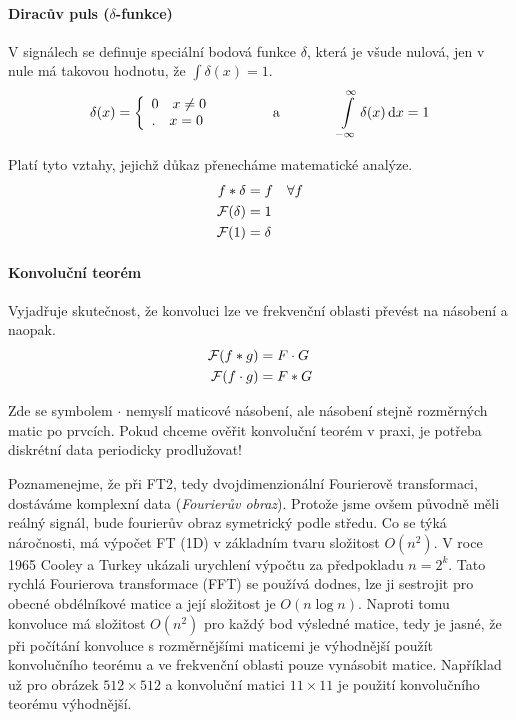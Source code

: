 \paragraph{Diracův puls ($\delta$-funkce)} 

V signálech se definuje speciální bodová funkce $\delta$, která je všude nulová, jen v nule má takovou hodnotu, že
$\int \delta(x)=1$.
\begin{align}
\delta(x) = \left\{\begin{array}{ll}0\quad x\neq0\\.\quad x=0\end{array}\right. \qquad \qquad \text{a} \qquad \qquad
\int\limits_{-\infty}^\infty\delta(x)\dif x = 1
\end{align}

Platí tyto vztahy, jejichž důkaz přenecháme matematické analýze.
\begin{align}
f\ast\delta &= f\quad\forall f\\
\operatorname{\mathcal{F}}(\delta) &= 1\\
\operatorname{\mathcal{F}}(1) &= \delta
\end{align}

\paragraph{Konvoluční teorém} Vyjadřuje skutečnost, že konvoluci lze ve frekvenční oblasti převést na násobení a naopak.
\begin{align}
\operatorname{\mathcal{F}}(f\ast g) &= F\cdot G\\
\operatorname{\mathcal{F}}(f\cdot g) &= F\ast G
\end{align}

Zde se symbolem $\cdot$ nemyslí maticové násobení, ale násobení stejně rozměrných matic po prvcích. Pokud chceme ověřit konvoluční teorém v praxi, je potřeba diskrétní data periodicky prodlužovat!

Poznamenejme, že při FT2, tedy dvojdimenzionální Fourierově transformaci, dostáváme komplexní data (\emph{Fourierův obraz}). Protože jsme ovšem původně měli reálný signál, bude fourierův obraz symetrický podle středu. Co se týká náročnosti, má výpočet FT (1D) v základním tvaru složitost $O(n^2)$. V roce 1965 Cooley a Turkey ukázali urychlení výpočtu za předpokladu $n=2^k$. Tato rychlá Fourierova transformace (FFT) se používá dodnes, lze ji sestrojit pro obecné obdélníkové matice a její složitost je $O(n\log n)$. Naproti tomu konvoluce má složitost $O(n^2)$ pro každý bod výsledné matice, tedy je jasné, že při počítání konvoluce s rozměrnějšími maticemi je výhodnější použít konvolučního teorému a ve frekvenční oblasti pouze vynásobit matice. Například už pro obrázek $512\times512$ a konvoluční matici $11\times11$ je použití konvolučního teorému výhodnější.

